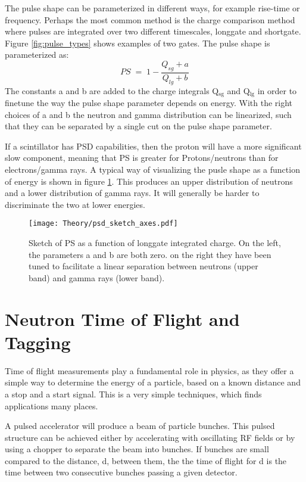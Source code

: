 \documentclass[main.tex]{subfiles}
\begin{document}
The pulse shape can be parameterized in different ways, for example rise-time or frequency. Perhaps the most common method is the charge comparison method where pulses are integrated over two different timescales, longgate and shortgate. Figure \ref{fig:pulse_types} shows examples of two gates. The pulse shape is parameterized as:
\begin{equation}
	PS \; = \; 1-\frac{Q_{sg} + a}{Q_{lg} + b}
	\label{eq:ps}
\end{equation}
The constants a and b are added to the charge integrals Q$_\text{sg}$ and Q$_\text{lg}$ in order to finetune the way the pulse shape parameter depends on energy. With the right choices of a and b the neutron and gamma distribution can be linearized, such that they can be separated by a single cut on the pulse shape parameter.

If a scintillator has PSD capabilities, then the proton will have a more significant slow component, meaning that PS is greater for Protons/neutrons than for electrons/gamma rays. A typical way of visualizing the pusle shape as a function of energy is shown in figure \ref{fig:psd_sketch}. This produces an upper distribution of neutrons and a lower distribution of gamma rays. It will generally be harder to discriminate the two at lower energies.
\begin{figure}[ht]
    \centering
        \texttt{[image: Theory/psd\_sketch\_axes.pdf]}
        \caption[Pulse shape discrimination sketch]{Sketch of PS as a function of longgate integrated charge. On the left, the parameters a and b are both zero. on the right they have been tuned to facilitate a linear separation between neutrons (upper band) and gamma rays (lower band).}
    \label{fig:psd_sketch} 
\end{figure}


\section{Neutron Time of Flight and Tagging}
Time of flight measurements play a fundamental role in physics, as they offer a simple way to determine the energy of a particle, based on a known distance and a stop and a start signal. This is a very simple techniques, which finds applications many places.

A pulsed accelerator will produce a beam of particle bunches. This pulsed structure can be achieved either by accelerating with oscillating RF fields or by using a chopper to separate the beam into bunches. If bunches are small compared to the distance, d, between them, the the time of flight for d is the time between two consecutive bunches passing a given detector.
\end{document}
